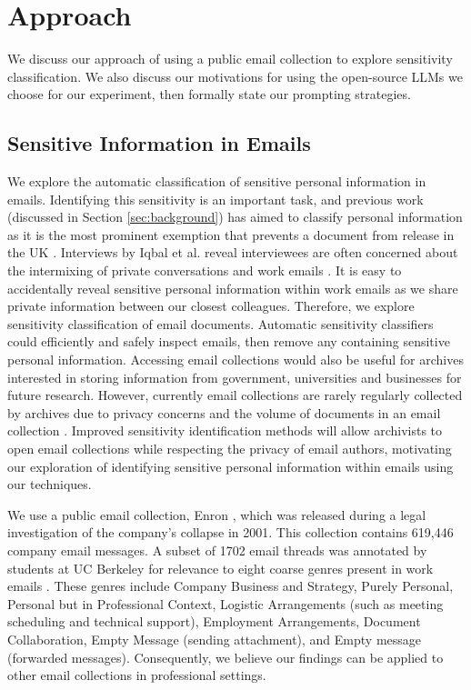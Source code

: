 \section{Approach}
We discuss our approach of using a public email collection to explore sensitivity classification. We also discuss our motivations for using the open-source LLMs we choose for our experiment, then formally state our prompting strategies.

\subsection{Sensitive Information in Emails}
We explore the automatic classification of sensitive personal information in emails. Identifying this sensitivity is an important task, and previous work (discussed in Section \ref{sec:background}) has aimed to classify personal information as it is the most prominent exemption that prevents a document from release in the UK \cite{TNA:16}. Interviews by Iqbal et al. reveal interviewees are often concerned about the intermixing of private conversations and work emails \cite{iqbal2021search}. It is easy to accidentally reveal sensitive personal information within work emails as we share private information between our closest colleagues. Therefore, we explore sensitivity classification of email documents. Automatic sensitivity classifiers could efficiently and safely inspect emails, then remove any containing sensitive personal information. Accessing email collections would also be useful for archives interested in storing information from government, universities and businesses for future research. However, currently email collections are rarely regularly collected by archives due to privacy concerns and the volume of documents in an email collection \cite{TFTAEA:18}. Improved sensitivity identification methods will allow archivists to open email collections while respecting the privacy of email authors, motivating our exploration of identifying sensitive personal information within emails using our techniques.

We use a public email collection, Enron \cite{klimt2004enron}, which was released during a legal investigation of the company’s collapse in 2001. This collection contains 619,446 company email messages. A subset of 1702 email threads was annotated by students at UC Berkeley for relevance to eight coarse genres present in work emails \cite{hearst2005teaching}. These genres include Company Business and Strategy, Purely Personal, Personal but in Professional Context, Logistic Arrangements (such as meeting scheduling and technical support), Employment Arrangements, Document Collaboration, Empty Message (sending attachment), and Empty message (forwarded messages). Consequently, we believe our findings can be applied to other email collections in professional settings.

